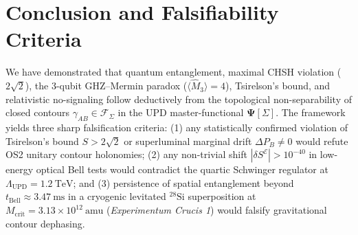 \documentclass[11pt,a4paper]{article}
\begin{document}
\section{Conclusion and Falsifiability Criteria}
We have demonstrated that quantum entanglement, maximal CHSH violation ($2\sqrt{2}$), the 3-qubit GHZ--Mermin paradox ($\langle\hat{M}_3\rangle = 4$), Tsirelson's bound, and relativistic no-signaling follow deductively from the topological non-separability of closed contours $\gamma_{AB} \in \mathcal{F}_\Sigma$ in the UPD master-functional $\mathbf{\Psi}[\Sigma]$. The framework yields three sharp falsification criteria: (1) any statistically confirmed violation of Tsirelson's bound $S > 2\sqrt{2}$ or superluminal marginal drift $\Delta P_B \neq 0$ would refute OS2 unitary contour holonomies; (2) any non-trivial shift $|\delta S^{\mathcal{E}}| > 10^{-40}$ in low-energy optical Bell tests would contradict the quartic Schwinger regulator at $\Lambda_{\mathrm{UPD}} = 1.2\ \mathrm{TeV}$; and (3) persistence of spatial entanglement beyond $t_{\mathrm{Bell}} \approx 3.47\ \mathrm{ms}$ in a cryogenic levitated $^{28}\mathrm{Si}$ superposition at $M_{\mathrm{crit}} = 3.13 \times 10^{12}\ \mathrm{amu}$ (\textit{Experimentum Crucis 1}) would falsify gravitational contour dephasing.
\end{document}
